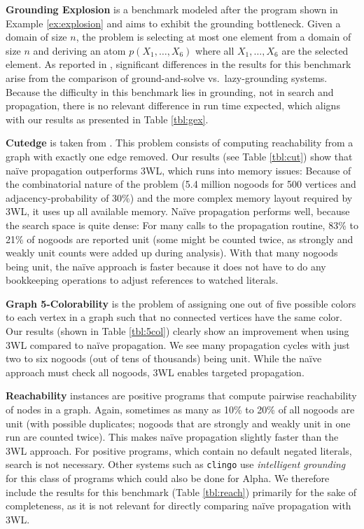 \documentclass[final]{vutinfth} %
\begin{document}
\begin{description}
\item{\bfseries Grounding Explosion} is a benchmark modeled after the program shown in Example \ref{ex:explosion} and aims to exhibit the grounding bottleneck. Given a domain of size $n$, the problem is selecting at most one element from a domain of size $n$ and deriving an atom $p(X_1, \ldots , X_6)$ where all $X_1, \ldots , X_6$ are the selected element.
As reported in \cite{alpha-techniques}, significant differences in the results for this benchmark arise from the comparison of ground-and-solve vs.~lazy-grounding systems. Because the difficulty in this benchmark lies in grounding, not in search and propagation, there is no relevant difference in run time expected, which aligns with our results as presented in Table \ref{tbl:gex}.

\item{\bfseries Cutedge} is taken from \cite[Example 1]{omiga}. This problem consists of computing reachability from a graph with exactly one edge removed.
Our results (see Table \ref{tbl:cut}) show that na\"{i}ve propagation outperforms 3WL, which runs into memory issues: Because of the combinatorial nature of the problem (5.4 million nogoods for 500 vertices and adjacency-probability of 30\%) and the more complex memory layout required by 3WL, it uses up all available memory. Na\"{i}ve propagation performs well, because the search space is quite dense: For many calls to the propagation routine, 83\% to 21\% of nogoods are reported unit (some might be counted twice, as strongly and weakly unit counts were added up during analysis). With that many nogoods being unit, the na\"{i}ve approach is faster because it does not have to do any bookkeeping operations to adjust references to watched literals.

\item{\bfseries Graph 5-Colorability} is the problem of assigning one out of five possible colors to each vertex in a graph such that no connected vertices have the same color. Our results (shown in Table \ref{tbl:5col}) clearly show an improvement when using 3WL compared to na\"{i}ve propagation. We see many propagation cycles with just two to six nogoods (out of tens of thousands) being unit. While the na\"{i}ve approach must check all nogoods, 3WL enables targeted propagation.

\item{\bfseries Reachability} instances are positive programs that compute pairwise reachability of nodes in a graph. Again, sometimes as many as 10\% to 20\% of all nogoods are unit (with possible duplicates; nogoods that are strongly and weakly unit in one run are counted twice). This makes na\"{i}ve propagation slightly faster than the 3WL approach.
For positive programs, which contain no default negated literals, search is not necessary. Other systems such as \texttt{clingo} use \emph{intelligent grounding} for this class of programs which could also be done for Alpha. We therefore include the results for this benchmark (Table \ref{tbl:reach}) primarily for the sake of completeness, as it is not relevant for directly comparing na\"{i}ve propagation with 3WL.
\end{description}
\end{document}
